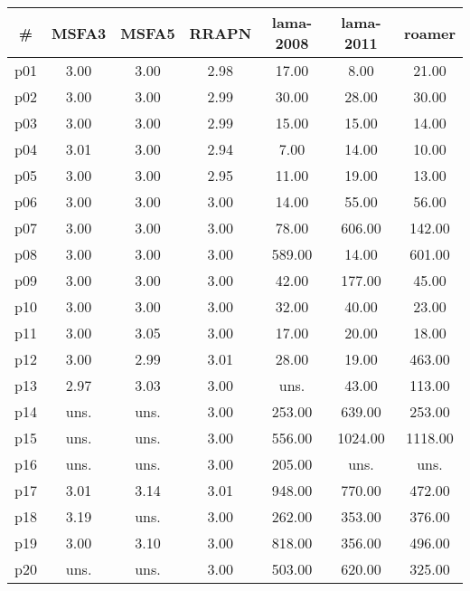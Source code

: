 \begin{tabular}{c||c|c|c|c|c|c}
\textbf{\#} & \textbf{MSFA3} & \textbf{MSFA5} & \textbf{RRAPN} & \textbf{lama-2008} & \textbf{lama-2011} & \textbf{roamer}\\
\hline
\hline
p01 & 3.00 & 3.00 & 2.98 & 17.00 & 8.00 & 21.00\\
p02 & 3.00 & 3.00 & 2.99 & 30.00 & 28.00 & 30.00\\
p03 & 3.00 & 3.00 & 2.99 & 15.00 & 15.00 & 14.00\\
p04 & 3.01 & 3.00 & 2.94 & 7.00 & 14.00 & 10.00\\
p05 & 3.00 & 3.00 & 2.95 & 11.00 & 19.00 & 13.00\\
p06 & 3.00 & 3.00 & 3.00 & 14.00 & 55.00 & 56.00\\
p07 & 3.00 & 3.00 & 3.00 & 78.00 & 606.00 & 142.00\\
p08 & 3.00 & 3.00 & 3.00 & 589.00 & 14.00 & 601.00\\
p09 & 3.00 & 3.00 & 3.00 & 42.00 & 177.00 & 45.00\\
p10 & 3.00 & 3.00 & 3.00 & 32.00 & 40.00 & 23.00\\
p11 & 3.00 & 3.05 & 3.00 & 17.00 & 20.00 & 18.00\\
p12 & 3.00 & 2.99 & 3.01 & 28.00 & 19.00 & 463.00\\
p13 & 2.97 & 3.03 & 3.00 & uns. & 43.00 & 113.00\\
p14 & uns. & uns. & 3.00 & 253.00 & 639.00 & 253.00\\
p15 & uns. & uns. & 3.00 & 556.00 & 1024.00 & 1118.00\\
p16 & uns. & uns. & 3.00 & 205.00 & uns. & uns.\\
p17 & 3.01 & 3.14 & 3.01 & 948.00 & 770.00 & 472.00\\
p18 & 3.19 & uns. & 3.00 & 262.00 & 353.00 & 376.00\\
p19 & 3.00 & 3.10 & 3.00 & 818.00 & 356.00 & 496.00\\
p20 & uns. & uns. & 3.00 & 503.00 & 620.00 & 325.00\\
\end{tabular}

